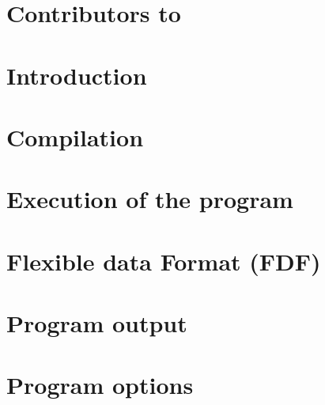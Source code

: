 





\section*{Contributors to \siesta}



\newpage
\tableofcontents
\newpage

\section{Introduction}



\section{Compilation}
\label{sec:compilation}



\section{Execution of the program}



\section{Flexible data Format (FDF)}



\section{Program output}



\section{Program options}




